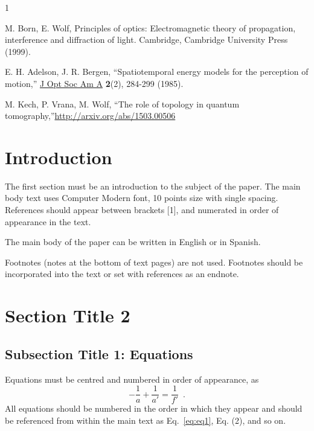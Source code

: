 \documentclass[10pt,letterpaper]{article}
\begin{document}

% 
% 

\begin{thebibliography}{1}
\newcommand{\enquote}[1]{``#1''}

M. Born, E. Wolf, Principles of optics: Electromagnetic theory of propagation, interference and diffraction of light. Cambridge, Cambridge University Press (1999).

E. H. Adelson, J. R. Bergen, ``Spatiotemporal energy models for the perception of motion,'' \href{https://doi.org/10.1364/JOSAA.2.000284}{J Opt Soc Am A} \textbf{2}(2), 284-299 (1985).

M. Kech, P. Vrana, M. Wolf, “The role of topology in quantum tomography,”\url{http://arxiv.org/abs/1503.00506}

\end{thebibliography}




\section{Introduction}
The first section must be an introduction to the subject of the paper. The main body text uses Computer Modern font, 10 points size with single spacing. References should appear between brackets [1], and numerated in order of appearance in the text.

\bigskip

\noindent The main body of the paper can be written in English or in Spanish.

\bigskip

Footnotes (notes at the bottom of text pages) are not used. Footnotes should be incorporated into the text or set with references as an endnote.

\section{Section Title 2}
\subsection{Subsection Title 1: Equations}
Equations must be centred and numbered in order of appearance, as
% 
\begin{equation}
    -\frac{1}{a}+\frac{1}{a'}=\frac{1}{f'} \enspace.
    \label{eq:eq1}
\end{equation}
% 
All equations should be numbered in the order in which they appear and should be referenced  from within the main text as Eq.~\eqref{eq:eq1}, Eq. (2), and so on.
\end{document}
